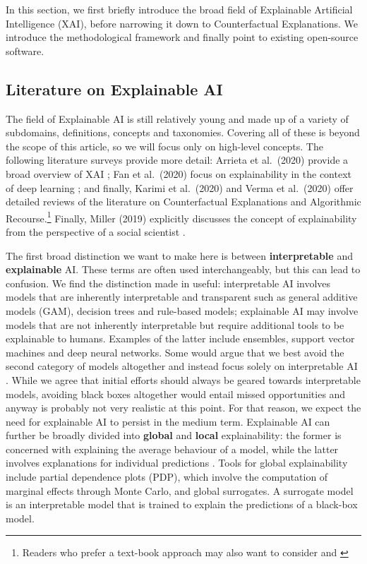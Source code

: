 \documentclass[
  letterpaper,
  DIV=11,
  numbers=noendperiod]{scrartcl}
\begin{document}
In this section, we first briefly introduce the broad field of
Explainable Artificial Intelligence (XAI), before narrowing it down to
Counterfactual Explanations. We introduce the methodological framework
and finally point to existing open-source software.

\hypertarget{literature-on-explainable-ai}{%
\subsection{Literature on Explainable
AI}\label{literature-on-explainable-ai}}

The field of Explainable AI is still relatively young and made up of a
variety of subdomains, definitions, concepts and taxonomies. Covering
all of these is beyond the scope of this article, so we will focus only
on high-level concepts. The following literature surveys provide more
detail: Arrieta et al.~(2020) provide a broad overview of XAI
\cite{arrieta2020explainable}; Fan et al.~(2020) focus on explainability
in the context of deep learning \cite{fan2020interpretability}; and
finally, Karimi et al.~(2020) \cite{karimi2020survey} and Verma et
al.~(2020) \cite{verma2020counterfactual} offer detailed reviews of the
literature on Counterfactual Explanations and Algorithmic
Recourse.\footnote{Readers who prefer a text-book approach may also want
  to consider \cite{molnar2020interpretable} and
  \cite{varshney2022trustworthy}} Finally, Miller (2019) explicitly
discusses the concept of explainability from the perspective of a social
scientist \cite{miller2019explanation}.

The first broad distinction we want to make here is between
\textbf{interpretable} and \textbf{explainable} AI. These terms are
often used interchangeably, but this can lead to confusion. We find the
distinction made in \cite{rudin2019stop} useful: interpretable AI
involves models that are inherently interpretable and transparent such
as general additive models (GAM), decision trees and rule-based models;
explainable AI may involve models that are not inherently interpretable
but require additional tools to be explainable to humans. Examples of
the latter include ensembles, support vector machines and deep neural
networks. Some would argue that we best avoid the second category of
models altogether and instead focus solely on interpretable AI
\cite{rudin2019stop}. While we agree that initial efforts should always
be geared towards interpretable models, avoiding black boxes altogether
would entail missed opportunities and anyway is probably not very
realistic at this point. For that reason, we expect the need for
explainable AI to persist in the medium term. Explainable AI can further
be broadly divided into \textbf{global} and \textbf{local}
explainability: the former is concerned with explaining the average
behaviour of a model, while the latter involves explanations for
individual predictions \cite{molnar2020interpretable}. Tools for global
explainability include partial dependence plots (PDP), which involve the
computation of marginal effects through Monte Carlo, and global
surrogates. A surrogate model is an interpretable model that is trained
to explain the predictions of a black-box model.
\end{document}
